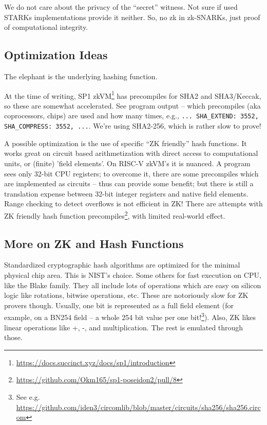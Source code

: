 \documentclass[twocolumn]{article}
\begin{document}
We do not care about the privacy of the ``secret'' witness. Not sure if used STARKs implementations provide it neither. So, no zk in zk-SNARKs, just proof of computational integrity.


\subsection{Optimization Ideas}

The elephant is the underlying hashing function.

At the time of writing, SP1 zkVM\footnote{\url{https://docs.succinct.xyz/docs/sp1/introduction}} has precompiles for SHA2 and SHA3/Keccak, so these are somewhat accelerated. See program output -- which precompiles (aka coprocessors, chips) are used and how many times, e.g., \lstinline|... SHA_EXTEND: 3552, SHA_COMPRESS: 3552, ...|. We're using SHA2-256, which is rather slow to prove!

A possible optimization is the use of specific ``ZK friendly'' hash functions. It works great on circuit based arithmetization with direct access to computational units, or (finite) 'field elements'. On RISC-V zkVM's it is nuanced. A program sees only 32-bit CPU registers; to overcome it, there are some precompiles which are implemented as circuits -- thus can provide some benefit; but there is still a translation expense between 32-bit integer registers and native field elements. Range checking to detect overflows is not efficient in ZK! There are attempts with ZK friendly hash function precompiles\footnote{\url{https://github.com/Okm165/sp1-poseidon2/pull/8}}, with limited real-world effect.


\subsection{More on ZK and Hash Functions}

Standardized cryptographic hash algorithms are optimized for the minimal physical chip area. This is NIST's choice. Some others for fast execution on CPU, like the Blake family. They all include lots of operations which are easy on silicon logic like rotations, bitwise operations, etc. These are notoriously slow for ZK provers though. Usually, one bit is represented as a full field element (for example, on a BN254 field -- a whole 254 bit value per one bit!\footnote{See e.g. \url{https://github.com/iden3/circomlib/blob/master/circuits/sha256/sha256.circom}}). Also, ZK likes linear operations like +, -, and multiplication. The rest is emulated through those.
\end{document}
